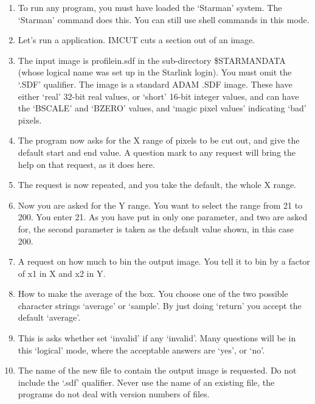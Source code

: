  
{\small 
\begin{enumerate}
 
\item To run any \starman program, you must have loaded the `Starman' system.
The `Starman' command does this.  You can still use shell commands
in this mode.
 
\item Let's run a \starman application.  IMCUT cuts a section out of an
image.
 
\item The input image is profile{\undersc}in.sdf in the sub-directory
\$STARMAN{\undersc}DATA (whose logical name was set up in the Starlink login).
You must omit the `.SDF' qualifier.  The image is a standard \starman ADAM
.SDF image. These have either `real' 32-bit real values, or `short' 16-bit
integer values, and can have the `BSCALE' and `BZERO' values, and
`magic pixel values' indicating `bad' pixels.
 
\item The program now asks for the X range of pixels to be cut out,
and give the default start and end value. A question mark to any
\starman request will bring the help on that request, as it does here.
 
\item The request is now repeated, and you take the default, the whole
X range.
 
\item Now you are asked for the Y range. You want to select the range
from 21 to 200. You enter 21. As you have put in only
one parameter, and two are asked for, the second parameter is
taken as the default value shown, in this case 200.
 
\item A request on how much to bin the output image. You tell it to
      bin by a factor of x1 in X and x2 in Y.
 
\item How to make the average of the box. You choose one of the two
      possible character strings `average' or `sample'. By just doing
      `return' you accept the default `average'.
 
\item This is asks whether set `invalid' if any `invalid'.
      Many questions will be in this `logical' mode, where the
      acceptable answers are `yes', or `no'.
 
\item The name of the new file to contain the output image is requested.
      Do not include the `.sdf' qualifier. Never use the name of an
      existing file, the programs do not deal with version numbers
      of files.
 

\end{enumerate}}
